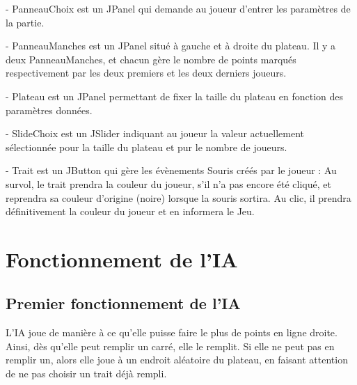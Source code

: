 \documentclass{report}
\begin{document}
- PanneauChoix est un JPanel qui demande au joueur d'entrer les paramètres de la partie.

- PanneauManches est un JPanel situé à gauche et à droite du plateau. Il y a deux PanneauManches, et chacun gère le nombre de points marqués respectivement par les deux premiers et les deux derniers joueurs.

- Plateau est un JPanel permettant de fixer la taille du plateau en fonction des paramètres données.

- SlideChoix est un JSlider indiquant au joueur la valeur actuellement sélectionnée pour la taille du plateau et pur le nombre de joueurs.

- Trait est un JButton qui gère les évènements Souris créés par le joueur : Au survol, le trait prendra la couleur du joueur, s'il n'a pas encore été cliqué, et reprendra sa couleur d'origine (noire) lorsque la souris sortira. Au clic, il prendra définitivement la couleur du joueur et en informera le Jeu.

\chapter{Fonctionnement de l'IA}
\section{Premier fonctionnement de l'IA}
L'IA joue de manière à ce qu'elle puisse faire le plus de points en ligne droite. Ainsi, dès qu'elle peut remplir un carré, elle le remplit. Si elle ne peut pas en remplir un, alors elle joue à un endroit aléatoire du plateau, en faisant attention de ne pas choisir un trait déjà rempli.
\end{document}
